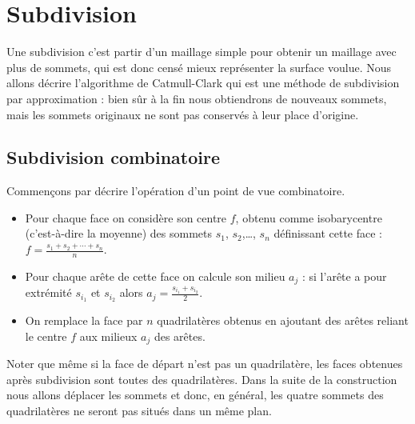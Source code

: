 \documentclass[11pt,class=report,crop=false]{standalone}
\begin{document}


\section{Subdivision}

Une subdivision c'est partir d'un maillage simple pour obtenir un maillage avec plus de sommets, qui est donc censé mieux représenter la surface voulue. Nous allons décrire l'algorithme de Catmull-Clark qui est une méthode de subdivision par approximation : bien sûr à la fin nous obtiendrons de nouveaux sommets, mais les sommets originaux ne sont pas conservés à leur place d'origine.


\subsection{Subdivision combinatoire}

Commençons par décrire l'opération d'un point de vue combinatoire.
\begin{itemize}
	\item Pour chaque face on considère son centre $f$, obtenu comme isobarycentre (c'est-à-dire la moyenne) des sommets $s_1$, $s_2$,\ldots, $s_n$ définissant cette face :
	$f = \frac{s_1+s_2+\cdots + s_n}{n}$.
	
	\item Pour chaque arête de cette face on calcule son milieu $a_j$ :
	si l'arête a pour extrémité $s_{i_1}$ et $s_{i_2}$ alors $a_j= \frac{s_{i_1}+s_{i_2}}{2}$.
	
	\item On remplace la face par $n$ quadrilatères obtenus en ajoutant des arêtes reliant le centre $f$ aux milieux $a_j$ des arêtes. 
\end{itemize}



Noter que même si la face de départ n'est pas un quadrilatère, les faces obtenues après subdivision sont toutes des quadrilatères. Dans la suite de la construction nous allons déplacer les sommets et donc, en général, les quatre sommets des quadrilatères ne seront pas situés dans un même plan.

\end{document}
